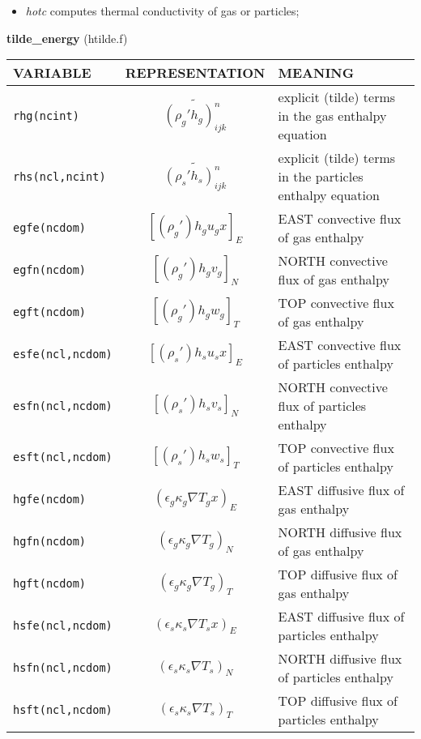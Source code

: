 \begin{itemize}
\item{\em hotc} computes thermal conductivity of gas or particles;
\end{itemize}
%
%
{\large {\bf tilde\_energy}} (htilde.f)\\[5mm]
\begin{tabular}{|p{6cm}|c|p{6cm}|}\hline
VARIABLE & REPRESENTATION & MEANING\\\hline
\tt rhg(ncint) & $\widetilde{(\rho_g'h_g)_{ijk}^n}$ & explicit (tilde) terms in the gas enthalpy equation\\\hline
\tt rhs(ncl,ncint)& $\widetilde{(\rho_s' h_s)_{ijk}^n}$ & explicit (tilde) terms in the particles enthalpy equation\\\hline
\tt egfe(ncdom) & $\left[ (\rho_g')h_g u_g x \right]_{E}$ &EAST convective flux of gas enthalpy\\\hline
\tt egfn(ncdom) & $\left[ (\rho_g')h_g v_g \right]_{N}$ &NORTH convective flux of gas enthalpy\\\hline
\tt egft(ncdom) & $\left[ (\rho_g')h_g w_g \right]_{T}$ &TOP convective flux of gas enthalpy\\\hline
\tt esfe(ncl,ncdom)& $\left[ (\rho_s')h_su_s x\right]_{E}$ &EAST convective flux of particles enthalpy\\\hline
\tt esfn(ncl,ncdom)& $\left[ (\rho_s')h_sv_s \right]_{N}$ &NORTH convective flux of particles enthalpy\\\hline
\tt esft(ncl,ncdom)& $\left[ (\rho_s')h_sw_s \right]_{T}$ &TOP convective flux of particles enthalpy\\\hline
\tt hgfe(ncdom)&$ (\epsilon_g \kappa_g \nabla T_gx)_{E}$ &EAST diffusive flux of gas enthalpy\\\hline
\tt hgfn(ncdom)&$ (\epsilon_g \kappa_g \nabla T_g)_{N}$ &NORTH diffusive flux of gas enthalpy\\\hline
\tt hgft(ncdom)&$ (\epsilon_g \kappa_g \nabla T_g)_{T}$ &TOP diffusive flux of gas enthalpy\\\hline
\tt hsfe(ncl,ncdom)&$ (\epsilon_s \kappa_s \nabla T_sx)_{E}$ &EAST diffusive flux of particles enthalpy\\\hline
\tt hsfn(ncl,ncdom)&$ (\epsilon_s \kappa_s \nabla T_s)_{N}$ &NORTH diffusive flux of particles enthalpy\\\hline
\tt hsft(ncl,ncdom)&$ (\epsilon_s \kappa_s \nabla T_s)_{T}$ &TOP diffusive flux of particles enthalpy\\\hline
\end{tabular}\\
